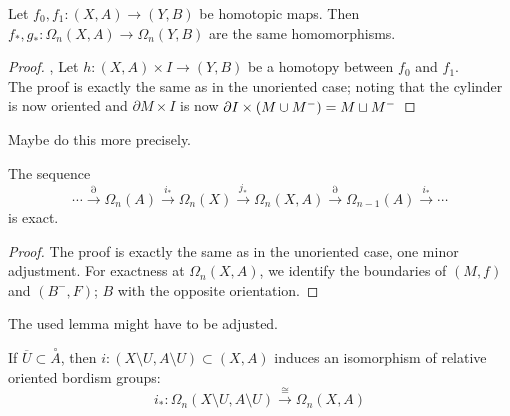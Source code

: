 \documentclass[a4paper,11pt]{article}
\begin{document}
\begin{lemma}
    Let \(f_0,f_1:(X,A)\to(Y,B)\) be homotopic maps. Then \(f_\ast,g_\ast:\Omega_n(X,A)\to\Omega_n(Y,B)\) are the same homomorphisms.
\end{lemma}

\begin{proof}\cite{atiyah}, \cite{conner}
    Let \(h:(X,A)\times I\to (Y,B)\) be a homotopy between \(f_0\) and \(f_1\).\\
    The proof is exactly the same as in the unoriented case; noting that the cylinder is now oriented and \(\partial M\times I\) is now \(\partial I\times (M\cup M^-)=M\sqcup M^-\)%
\end{proof}
Maybe do this more precisely.

\begin{lemma}
    The sequence
    \[\cdots\xrightarrow{\partial}\Omega_n(A)\xrightarrow{i_\ast}\Omega_n(X)\xrightarrow{j_\ast}\Omega_n(X,A)\xrightarrow{\partial}\Omega_{n-1}(A)\xrightarrow{i_\ast}\cdots\]
    is exact.
\end{lemma}

\begin{proof}\cite{conner}
    The proof is exactly the same as in the unoriented case, one minor adjustment. For exactness at \(\Omega_n(X,A)\), we identify the boundaries of \((M,f)\) and \((B^-,F)\); \(B\) with the opposite orientation.
\begin{comment}
    \begin{itemize}
        \item \textbf{Exactness at \(\Omega_n(A)\)}: \(i_\ast\circ\partial=0\), as \((M,f)\) is a nullbordism for \(i_\ast\circ\partial(M,f)=\partial(M,f)\)\\
        For a nullbordism \((B,g)\) of \(M,f\), \(\partial(B,g)=(M,f)\).
        \item \textbf{Exactness at \(\Omega_n(X)\)}: 
        \(j_\ast\circ i_\ast=0\) exactly as in the unoriented case.

        \item \textbf{Exactness at \(\Omega_n(X,A)\)}: 
    \end{itemize}
\end{comment}
\end{proof}
The used lemma might have to be adjusted.

\begin{lemma}
    If \(\overline{U}\subset\overset{\circ}{A}\), then \(i:(X\setminus U, A\setminus U)\subset (X,A)\) induces an isomorphism of relative oriented bordism groups:
    \[i_\ast:\Omega_n(X\setminus U,A\setminus U)\xrightarrow{\cong}\Omega_n(X,A)\]
\end{lemma}
\end{document}
